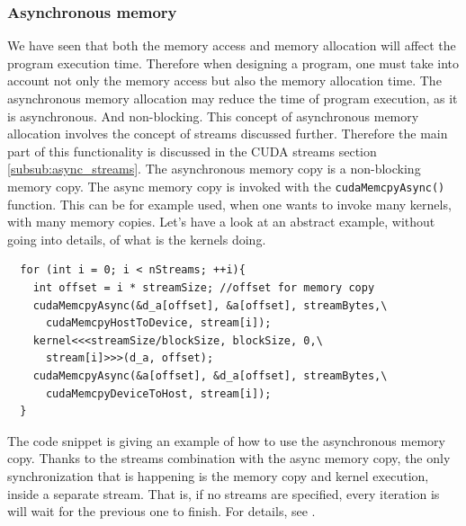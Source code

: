 \begin{itemize}
\subsubsection{Asynchronous memory}
  \label{subsub:async_mem}
  We have seen that both the memory access and memory allocation will affect the program execution time. 
  Therefore when designing a program, one must take into account not only the memory access but also 
  the memory allocation time. 
    The asynchronous memory allocation may reduce the time of program execution, as it is asynchronous. And 
    non-blocking. This concept of asynchronous memory allocation involves the concept of streams discussed 
    further. 
    Therefore the main part of this functionality is discussed in the CUDA streams section \autoref{subsub:async_streams}.
  The asynchronous memory copy is a non-blocking memory copy. The async memory copy is 
  invoked with the \verb|cudaMemcpyAsync()| function. This can be for example used, when one wants to invoke 
  many kernels, with many memory copies. Let's have a look at an abstract example, without going into details, of what is the kernels 
  doing. 
  \begin{listing}
  \begin{verbatim}
  for (int i = 0; i < nStreams; ++i){
    int offset = i * streamSize; //offset for memory copy 
    cudaMemcpyAsync(&d_a[offset], &a[offset], streamBytes,\
      cudaMemcpyHostToDevice, stream[i]);
    kernel<<<streamSize/blockSize, blockSize, 0,\
      stream[i]>>>(d_a, offset);
    cudaMemcpyAsync(&a[offset], &d_a[offset], streamBytes,\
      cudaMemcpyDeviceToHost, stream[i]);
  }
  \end{verbatim}
  \caption{The code snippet \cite{async_memcpy} is giving an example of how to use the asynchronous memory copy. 
Thanks to the streams combination with the async memory copy, the only synchronization that is happening is the memory copy and kernel execution, inside 
a separate stream. That is, if no streams are specified, every iteration is will wait for the previous one to finish. For details, see \cite{sec:streams}.}
\end{listing}

\end{itemize}
